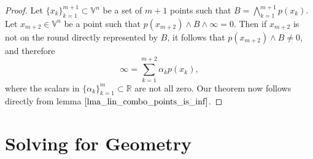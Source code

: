 \documentclass[12pt]{article}
\newcommand{\V}{\mathbb{V}}
\newcommand{\R}{\mathbb{R}}
\newcommand{\nvai}{\infty}
\begin{document}
\begin{proof}
Let $\{x_k\}_{k=1}^{m+1}\subset\V^n$ be a set of $m+1$ points
such that $B=\bigwedge_{k=1}^{m+1} p(x_k)$.
Let $x_{m+2}\in\V^n$ be a point such that $p(x_{m+2})\wedge B\wedge\nvai=0$.
Then if $x_{m+2}$ is not on the round directly represented by $B$, it follows
that $p(x_{m+2})\wedge B\neq 0$, and therefore
\begin{equation*}
\nvai = \sum_{k=1}^{m+2}\alpha_k p(x_k),
\end{equation*}
where the scalars in $\{\alpha_k\}_{k=1}^m\subset\R$ are not all zero.
Our theorem now follows directly from lemma $\eqref{lma_lin_combo_points_is_inf}$.
\end{proof}

\section{Solving for Geometry}
\end{document}
